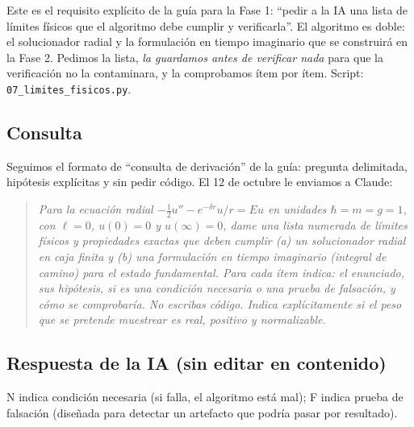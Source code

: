 \documentclass[11pt]{article}
\newenvironment{prompt}{\begin{quote}\itshape}{\end{quote}}
\begin{document}
Este es el requisito explícito de la guía para la Fase 1: ``pedir a la IA una lista de límites físicos que el algoritmo debe cumplir y verificarla''. El algoritmo es doble: el solucionador radial y la formulación en tiempo imaginario que se construirá en la Fase 2. Pedimos la lista, \emph{la guardamos antes de verificar nada} para que la verificación no la contaminara, y la comprobamos ítem por ítem. Script: \texttt{07\_limites\_fisicos.py}.

\subsection{Consulta}

Seguimos el formato de ``consulta de derivación'' de la guía: pregunta delimitada, hipótesis explícitas y sin pedir código. El 12 de octubre le enviamos a Claude:

\begin{prompt}
Para la ecuación radial $-\tfrac12u''-e^{-\delta r}u/r=Eu$ en unidades $\hbar=m=g=1$, con $\ell=0$, $u(0)=0$ y $u(\infty)=0$, dame una lista numerada de límites físicos y propiedades exactas que deben cumplir (a) un solucionador radial en caja finita y (b) una formulación en tiempo imaginario (integral de camino) para el estado fundamental. Para cada ítem indica: el enunciado, sus hipótesis, si es una condición necesaria o una prueba de falsación, y cómo se comprobaría. No escribas código. Indica explícitamente si el peso que se pretende muestrear es real, positivo y normalizable.
\end{prompt}

\subsection{Respuesta de la IA (sin editar en contenido)}

N indica condición necesaria (si falla, el algoritmo está mal); F indica prueba de falsación (diseñada para detectar un artefacto que podría pasar por resultado).
\end{document}

